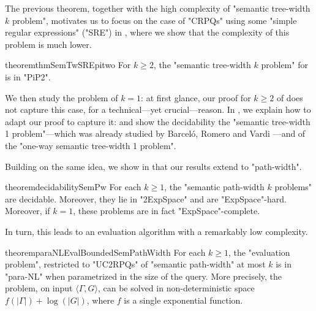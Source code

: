 
The previous theorem, together with the high complexity of "semantic tree-width $k$ problem",
motivates us to focus on the case of "CRPQs" using some "simple regular expressions" ("SRE") in , where we show that the complexity of this problem is much lower.

\begin{restatable*}{theorem}{thmSemTwSREpitwo}
    \AP\label{thm:semtw-sre-pitwo}
    For $k\geq 2$, the "semantic tree-width $k$ problem" for {\UCRPQSRE} is in "PiP2".
\end{restatable*}

We then study the problem of $k=1$: at first glance, our proof for $k\geq 2$ of
 does not capture this case, for a technical---yet crucial---reason. In
, we explain how to adapt our proof to capture it: 
and show the decidability the "semantic tree-width 1 problem"---which was already studied by 
Barceló, Romero and Vardi \cite{BarceloRomeroVardi2016SemanticAcyclicity}---and of the "one-way semantic tree-width 1 problem". 

Building on the same idea, we show in  that our results extend to "path-width".
\begin{restatable*}{theorem}{decidabilitySemPw}
    \AP\label{thm:decidability-sempw}
    For each $k \geq 1$,
    the "semantic path-width $k$ problems" are decidable. Moreover, they lie in "2ExpSpace"
    and are "ExpSpace"-hard. Moreover, if $k=1$, these problems are in fact "ExpSpace"-complete.
\end{restatable*}
In turn, this leads to an evaluation algorithm with a remarkably low complexity.
\begin{restatable*}{theorem}{paraNLEvalBoundedSemPathWidth}
	\AP\label{thm:evaluation-bounded-pathwidth}
	For each $k \geq 1$, the "evaluation problem", restricted to "UC2RPQs" of
	"semantic path-width" at most $k$ is in "para-NL" when parametrized in the size of the query.
	More precisely, the problem, on input $\langle \Gamma, G \rangle$, can be solved in
	non-deterministic space $f(|\Gamma|) + \log(|G|)$, where $f$ is a single exponential
	function.
\end{restatable*}

